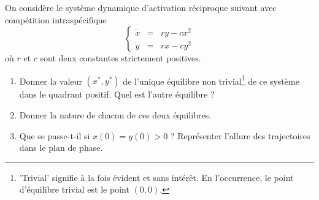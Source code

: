 \solution{\todo{}}

\begin{exercise} \label{SystDyn-Quadratique}
  On considère le système dynamique d’activation réciproque suivant avec compétition intraspécifique
  $$
  \left\{\begin{array}{rcl}
         \dot x & = & r y - cx^2 \\ 
         \dot y & = & r x - cy^2 
         \end{array}\right.
  $$
  où $r$ et $c$ sont deux constantes strictement positives.
  \begin{enumerate}
   \item Donner la valeur $(x^*, y^*)$ de l’unique équilibre non trivial\footnote{'Trivial' signifie à la fois évident et sans intérêt. En l'occurrence, le point d'équilibre trivial est le point $(0, 0)$.} de ce système dans le quadrant positif. Quel est l’autre équilibre ?
   \item Donner la nature de chacun de ces deux équilibres.
   \item Que se passe-t-il si $x(0) = y(0) > 0$ ? Représenter l’allure des trajectoires dans le plan de phase. 
  \end{enumerate}
\end{exercise}

\solution{\todo{}}
